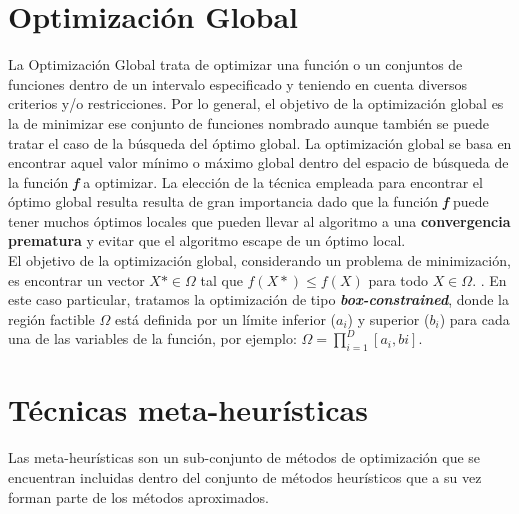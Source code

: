 

\section{Optimización Global}
\label{sec:OPT}


La Optimización Global trata de optimizar una función o un conjuntos de funciones dentro de un intervalo especificado y teniendo en cuenta diversos criterios y/o restricciones. Por lo general, el objetivo de la optimización global es la de minimizar ese conjunto de funciones nombrado aunque también se puede tratar el caso de la búsqueda del óptimo global. 
La optimización global se basa en encontrar aquel valor mínimo o máximo global dentro del espacio de búsqueda de la función \textbf{\textit{f}} a optimizar. La elección de la técnica empleada para encontrar el óptimo global resulta resulta de gran importancia dado que la función \textbf{\textit{f}} puede tener muchos óptimos locales que pueden llevar al algoritmo a una \textbf{convergencia prematura} y evitar que el algoritmo escape de un óptimo local. \\
El objetivo de la optimización global, considerando un problema de minimización, es encontrar un vector $X* \in \Omega$ tal que $f(X*) \leq f(X)$ para todo $X \in \Omega$. \cite{Segredo2017}.
En este caso particular, tratamos la optimización de tipo \textbf{\textit{box-constrained}}, donde la región factible $\Omega$ está definida por un límite inferior ($a_{i}$) y superior ($b_{i}$) para cada una de las variables de la función, por ejemplo: $\Omega = \prod^{D}_{i=1}[a_{i}, b{i}]$. \cite{Segredo2017}


\section{Técnicas meta-heurísticas}
\label{sec:META}

Las meta-heurísticas son un sub-conjunto de métodos de optimización que se encuentran incluidas dentro del conjunto de métodos heurísticos que a su vez forman parte de los métodos aproximados.


